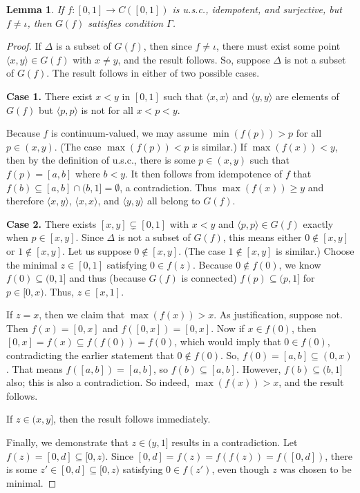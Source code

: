 \documentclass{amsart}
\newtheorem{lemma}[theorem]{Lemma}
\theoremstyle{definition}
\newcommand{\<}{\langle}
\renewcommand{\>}{\rangle}
\begin{document}
\begin{lemma} \label{big lemma}
If $f: [0,1] \rightarrow C([0,1])$ is u.s.c., idempotent, and surjective, but $f \not=\iota$, then $G(f)$ satisfies condition $\Gamma$.
\end{lemma}

\begin{proof}
If $\Delta$ is a subset of $G(f)$, then since $f \not=\iota$, there must exist some point $\<x,y\> \in G(f)$ with $x \not= y$, and the result follows. So, suppose $\Delta$ is not a subset of $G(f)$. The result follows in either of two possible cases.

\textbf{Case 1.} There exist $x<y$ in $[0,1]$ such that $\<x,x\>$ and $\<y,y\>$ are elements of $G(f)$ but $\<p,p\>$ is not for all $x<p<y$.

Because $f$ is continuum-valued, we may assume $\min(f(p))>p$ for all $p\in(x,y)$. (The case $\max(f(p))<p$ is similar.) If $\max(f(x))<y$, then by the definition of u.s.c., there is some $p\in(x,y)$ such that $f(p)=[a,b]$ where $b<y$. It then follows from idempotence of $f$ that $f(b)\subseteq [a,b]\cap(b,1]=\emptyset$, a contradiction. Thus $\max(f(x))\geq y$ and therefore $\<x,y\>$, $\<x,x\>$, and $\<y,y\>$ all belong to $G(f)$.

\textbf{Case 2.} There exists $[x,y]\subsetneq[0,1]$ with $x<y$ and $\<p,p\>\in G(f)$ exactly when $p\in[x,y]$. Since $\Delta$ is not a subset of $G(f)$, this means either $0 \not\in [x,y]$ or $1 \not\in [x,y]$. Let us suppose $0\not\in[x,y]$. (The case $1\not\in[x,y]$ is similar.) Choose the minimal $z\in[0,1]$ satisfying $0\in f(z)$. Because $0 \not\in f(0)$, we know $f(0) \subseteq (0,1]$ and thus (because $G(f)$ is connected) $f(p) \subseteq (p,1]$ for $p \in [0,x)$. Thus, $z \in [x,1]$.

If $z=x$, then we claim that $\max(f(x))>x$. As justification, suppose not. Then $f(x) = [0,x]$ and $f([0,x]) = [0,x]$. Now if $x \in f(0)$, then $[0,x] = f(x) \subseteq f(f(0)) = f(0)$, which would imply that $0 \in f(0)$, contradicting the earlier statement that $0 \not\in f(0)$. So, $f(0) = [a,b] \subseteq (0,x)$. That means $f([a,b]) = [a,b]$, so $f(b) \subseteq [a,b]$. However, $f(b) \subseteq (b,1]$ also; this is also a contradiction. So indeed, $\max(f(x))>x$, and the result follows.

If $z\in(x,y]$, then the result follows immediately.

Finally, we demonstrate that $z\in(y,1]$ results in a contradiction. Let $f(z)=[0,d]\subseteq[0,z)$. Since $[0,d]=f(z)=f(f(z))=f([0,d])$, there is some $z'\in[0,d]\subseteq[0,z)$ satisfying $0\in f(z')$, even though $z$ was chosen to be minimal.
\end{proof}
\end{document}
